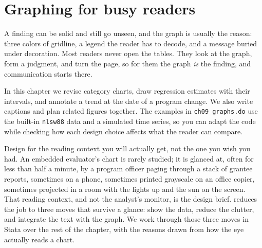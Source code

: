 \chapter{Graphing for busy readers}\label{ch:graphs}

A finding can be solid and still go unseen, and the graph is usually the reason: three colors of gridline, a legend the reader has to decode, and a message buried under decoration. Most readers never open the tables. They look at the graph, form a judgment, and turn the page, so for them the graph \emph{is} the finding, and communication starts there.

In this chapter we revise category charts, draw regression estimates with their intervals, and annotate a trend at the date of a program change. We also write captions and plan related figures together. The examples in \texttt{ch09\_graphs.do} use the built-in \texttt{nlsw88} data and a simulated time series, so you can adapt the code while checking how each design choice affects what the reader can compare.

Design for the reading context you will actually get, not the one you wish you had. An embedded evaluator's chart is rarely studied; it is glanced at, often for less than half a minute, by a program officer paging through a stack of grantee reports, sometimes on a phone, sometimes printed grayscale on an office copier, sometimes projected in a room with the lights up and the sun on the screen. That reading context, and not the analyst's monitor, is the design brief. \textcite{schwabish2014economist} reduces the job to three moves that survive a glance: show the data, reduce the clutter, and integrate the text with the graph. We work through those three moves in Stata over the rest of the chapter, with the reasons drawn from how the eye actually reads a chart.

